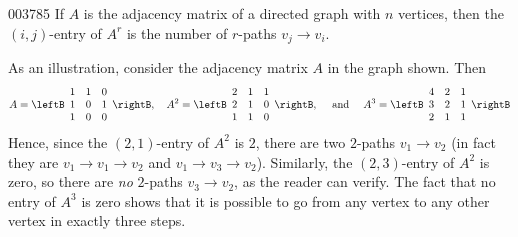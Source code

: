 \begin{theorem}{}{003785}
If $A$ is the adjacency matrix of a directed graph with $n$ vertices, then the $(i, j)$-entry of $A^r$ is the number of $r$-paths $v_{j} \to v_{i}$.
\end{theorem}

As an illustration, consider the adjacency matrix $A$ in the graph shown. Then
\begin{equation*}
A = \leftB \begin{array}{rrr}
1 & 1 & 0 \\
1 & 0 & 1 \\
1 & 0 & 0
\end{array} \rightB, \quad A^{2} = \leftB \begin{array}{rrr}
2 & 1 & 1 \\
2 & 1 & 0 \\
1 & 1 & 0
\end{array} \rightB, \quad \mbox{ and } \quad A^{3} = \leftB \begin{array}{rrr}
4 & 2 & 1 \\
3 & 2 & 1 \\
2 & 1 & 1
\end{array} \rightB
\end{equation*}
Hence, since the $(2, 1)$-entry of $A^{2}$ is $2$, there are two $2$-paths $v_{1} \to v_{2}$ (in fact they are $v_{1} \to v_{1} \to v_{2}$ and $v_{1} \to v_{3} \to v_{2}$). Similarly, the $(2, 3)$-entry of $A^{2}$ is zero, so there are \textit{no} $2$-paths $v_{3} \to v_{2}$, as the reader can verify. The fact that no entry of $A^{3}$ is zero shows that it is possible to go from any vertex to any other vertex in exactly three steps.


